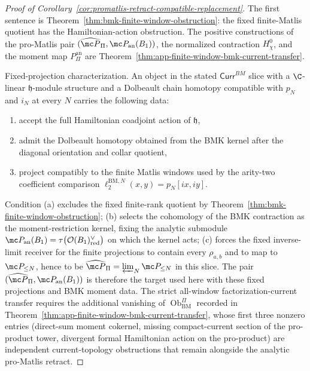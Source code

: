 \begin{proof}[Proof of Corollary~\ref{cor:promatlis-retract-compatible-replacement}]
  The first sentence is Theorem~\ref{thm:bmk-finite-window-obstruction}: the
  fixed finite-Matlis quotient has the Hamiltonian-action obstruction.  The
  positive constructions of the pro-Matlis pair \((\widehat{\mc
  P}_{\Pi},\mc P_{\mathrm{an}}(B_1))\), the normalized contraction
  \(H_\chi^0\), and the moment map \(P_{\Pi}^{\mathrm{an}}\) are
  Theorem~\ref{thm:app-finite-window-bmk-current-transfer}.

  Fixed-projection characterization.  An object in the stated
  \(\mathsf{Curr}^{BM}\) slice with a \(\C\)-linear
  \(\mathfrak h\)-module structure and a Dolbeault chain homotopy
  compatible with \(p_N\) and \(i_N\) at every \(N\) carries the
  following data:
  \begin{enumerate}[label=(\alph*)]
    \item accept the full Hamiltonian coadjoint action of
      \(\mathfrak h\),
    \item admit the Dolbeault homotopy obtained from the BMK kernel
      after the diagonal orientation and collar quotient,
    \item project compatibly to the finite Matlis windows used by the
      arity-two coefficient comparison
      \(\ell^{\mathrm{BM},N}_2(x,y)=p_N[ix,iy]\).
  \end{enumerate}
  Condition (a) excludes the fixed finite-rank quotient by
  Theorem~\ref{thm:bmk-finite-window-obstruction}; (b) selects the
  cohomology of the BMK contraction as the moment-restriction kernel,
  fixing the analytic submodule
  \(\mc P_{\mathrm{an}}(B_1)=\tau\bigl(\mathcal O(B_1)^\vee_{\mathrm{red}}\bigr)\)
  on which the kernel acts; (c) forces the fixed inverse-limit receiver
  for the finite projections to contain every \(\rho_{a,b}\) and to map
  to \(\mc P_{\leq N}\), hence to be
  \(\widehat{\mc P}_{\Pi}=\varprojlim_N\mc P_{\leq N}\) in this slice.
	  The pair \((\widehat{\mc P}_{\Pi},\mc P_{\mathrm{an}}(B_1))\) is
	  therefore the target used here with these fixed projections and BMK
  moment data.  The strict all-window factorization-current transfer
  requires the additional vanishing of
  \(\operatorname{Ob}^{\Pi}_{\mathrm{BM}}\) recorded in
  Theorem~\ref{thm:app-finite-window-bmk-current-transfer}, whose
  first three nonzero entries (direct-sum moment cokernel, missing
  compact-current section of the pro-product tower, divergent formal
  Hamiltonian action on the pro-product) are independent
  current-topology obstructions that remain alongside the analytic
  pro-Matlis retract.
\end{proof}

